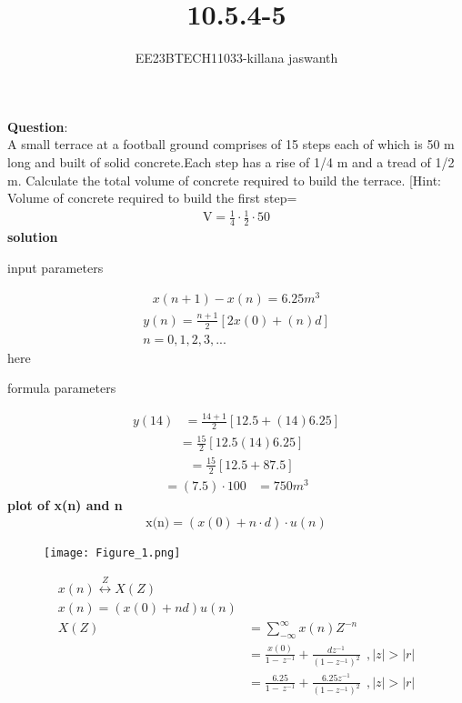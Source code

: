 \documentclass[journal,12pt,twocolumn]{IEEEtran}
\theoremstyle{remark}
\begin{document}

\vspace{3cm}

\title{10.5.4-5}
\author{EE23BTECH11033-killana jaswanth}
\maketitle
\newpage

\bigskip

\renewcommand{\thefigure}{\theenumi}
\renewcommand{\thetable}{\theenumi}
\textbf{Question}:\\
A small terrace at a football ground comprises of 15 steps each of which is 50
m long and built of solid concrete.Each step has a rise of 1/4 m and a tread of
1/2 m. Calculate the total volume of concrete required to build the terrace.
[Hint: Volume of concrete required to build the first step=\begin{align}
    \text{{V}}=\frac{1}{4} \cdot \frac{1}{2} \cdot 50 
\end{align}
\textbf{solution} 
\begin{table}[!ht]
 \centering
  
   \caption{input parameters}
   \label{tab:10.5.4.5}
   \end{table}
\begin{align}
x(n+1)-x(n)=6.25m^3
\end{align}
\begin{align}
y(n) = \frac{n+1}{2} [2x(0)+(n)d]   
\\n=0,1,2,3,...
\end{align}
here\\\begin{table}[!ht]
 \centering
  
   \caption{formula parameters}
   \label{tab:10.5.4.5}
   \end{table}
\begin{align}
y(14) &= \frac{14+1}{2} [12.5+(14)6.25]
\end{align}
\begin{align}
 &= \frac{15}{2}[12.5(14)6.25]
\end{align}
   \begin{align}
    &= \frac{15}{2} [12.5+87.5]
   \end{align}
   \begin{align}
   =(7.5) \cdot 100
   &=750m^3
   \end{align}
\textbf{plot of x(n) and n}
\begin{align}
    \text{{x(n)}}=(x(0)+n \cdot d ) \cdot u(n)
\end{align}
\begin{figure}[h]
    \renewcommand\thefigure{1}
    \centering
    \captionsetup{justification=centering}
    \texttt{[image: Figure\_1.png]}
    \caption{}
    \label{stemplot2}
\end{figure}\begin{align}
x(n)\overset{Z}{\longleftrightarrow}  X(Z)
\\x(n)=(x(0)+nd)u(n)
\\X(Z)&=\sum_{-\infty}^{\infty}x(n)Z^{-n}\
\\&=\frac{x(0)}{1-\,z^{-1}}+\frac{dz^{-1}}{({1-{z^{-1}}})^2}\:\:,|z|>|r|
\\&=\frac{6.25}{1-\,z^{-1}}+\frac{6.25z^{-1}}{({1-{z^{-1}}})^2}\:\:,|z|>|r|
\end{align}
\end{document}

